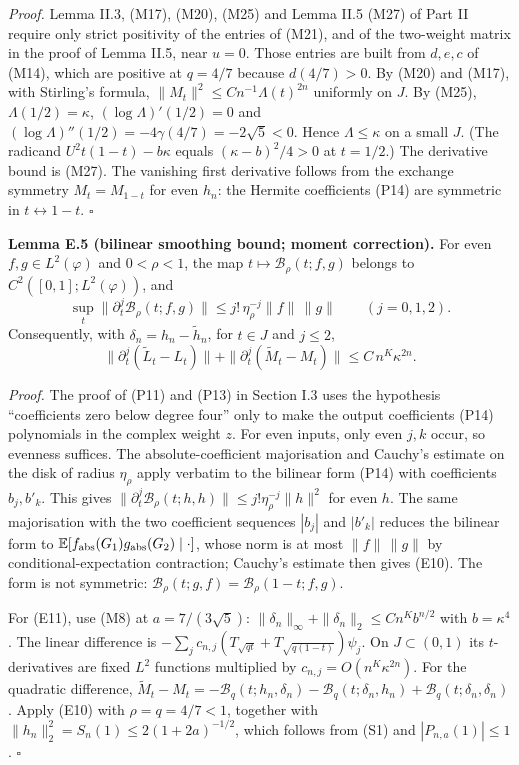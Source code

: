 \documentclass[
  british,
  10pt,
]{article}
\begin{document}
\emph{Proof.} Lemma II.3, (M17), (M20), (M25) and Lemma II.5 (M27) of
Part II require only strict positivity of the entries of (M21), and of
the two-weight matrix in the proof of Lemma II.5, near \(u=0\). Those
entries are built from \(d,e,c\) of (M14), which are positive at
\(q=4/7\) because \(d(4/7)>0\). By (M20) and (M17), with Stirling's
formula, \(\|M_t\|^2\le Cn^{-1}\Lambda(t)^{2n}\) uniformly on \(J\). By
(M25), \(\Lambda(1/2)=\kappa\), \((\log\Lambda)'(1/2)=0\) and
\((\log\Lambda)''(1/2)=-4\gamma(4/7)=-2\sqrt5<0\). Hence
\(\Lambda\le\kappa\) on a small \(J\). (The radicand
\(U^2t(1-t)-b\kappa\) equals \((\kappa-b)^2/4>0\) at \(t=1/2\).) The
derivative bound is (M27). The vanishing first derivative follows from
the exchange symmetry \(M_t=M_{1-t}\) for even \(h_n\): the Hermite
coefficients (P14) are symmetric in \(t\leftrightarrow1-t\). \(\square\)

\textbf{Lemma E.5 (bilinear smoothing bound; moment correction).} For
even \(f,g\in L^2(\varphi)\) and \(0<\rho<1\), the map
\(t\mapsto\mathcal B_\rho(t;f,g)\) belongs to
\(C^2([0,1];L^2(\varphi))\), and \[
\sup_t\|\partial_t^j\mathcal B_\rho(t;f,g)\|\le j!\,\eta_\rho^{-j}\|f\|\,\|g\|\qquad(j=0,1,2).
\tag{E10}
\] Consequently, with \(\delta_n=h_n-\widetilde h_n\), for \(t\in J\)
and \(j\le2\), \[
\|\partial_t^j(\widetilde L_t-L_t)\|+\|\partial_t^j(\widetilde M_t-M_t)\|\le C\,n^K\kappa^{2n}.
\tag{E11}
\]

\emph{Proof.} The proof of (P11) and (P13) in Section I.3 uses the
hypothesis ``coefficients zero below degree four'' only to make the
output coefficients (P14) polynomials in the complex weight \(z\). For
even inputs, only even \(j,k\) occur, so evenness suffices. The
absolute-coefficient majorisation and Cauchy's estimate on the disk of
radius \(\eta_\rho\) apply verbatim to the bilinear form (P14) with
coefficients \(b_j,b'_k\). This gives
\(\|\partial_t^j\mathcal B_\rho(t;h,h)\|\le j!\eta_\rho^{-j}\|h\|^2\)
for even \(h\). The same majorisation with the two coefficient sequences
\(|b_j|\) and \(|b'_k|\) reduces the bilinear form to
\(\mathbb E[f_{\rm abs}(G_1)g_{\rm abs}(G_2)\mid\cdot]\), whose norm is
at most \(\|f\|\,\|g\|\) by conditional-expectation contraction;
Cauchy's estimate then gives (E10). The form is not symmetric:
\(\mathcal B_\rho(t;g,f)=\mathcal B_\rho(1-t;f,g)\).

For (E11), use (M8) at \(a=7/(3\sqrt5)\):
\(\|\delta_n\|_\infty+\|\delta_n\|_2\le Cn^Kb^{n/2}\) with
\(b=\kappa^4\). The linear difference is
\(-\sum_jc_{n,j}(T_{\sqrt{qt}}+T_{\sqrt{q(1-t)}})\psi_j\). On
\(J\subset(0,1)\) its \(t\)-derivatives are fixed \(L^2\) functions
multiplied by \(c_{n,j}=O(n^K\kappa^{2n})\). For the quadratic
difference,
\(\widetilde M_t-M_t=-\mathcal B_q(t;h_n,\delta_n)-\mathcal B_q(t;\delta_n,h_n)+\mathcal B_q(t;\delta_n,\delta_n)\).
Apply (E10) with \(\rho=q=4/7<1\), together with
\(\|h_n\|_2^2=S_n(1)\le2(1+2a)^{-1/2}\), which follows from (S1) and
\(|P_{n,a}(1)|\le1\). \(\square\)
\end{document}
